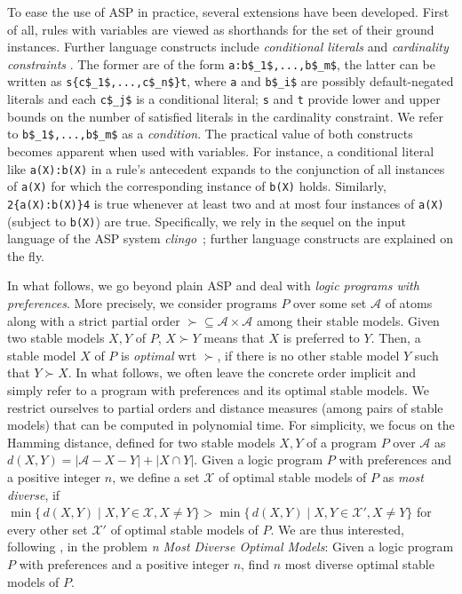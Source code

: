 \documentclass[a4paper,UKenglish]{oasics}
\newcommand{\sysfont}{\textit}
\newcommand{\clingo}{\sysfont{clingo}}
\begin{document}
To ease the use of ASP in practice, 
several extensions have been developed. 
First of all, rules with variables are viewed as shorthands for the set of their ground instances.
Further language constructs include
\emph{conditional literals} and \emph{cardinality constraints} \cite{siniso02a}.
The former are of the form
\lstinline[mathescape=true]{a:b$_1$,...,b$_m$},
the latter can be written as
\lstinline[mathescape=true]+s{c$_1$,...,c$_n$}t+,
where \lstinline{a} and \lstinline[mathescape=true]{b$_i$} are possibly default-negated literals  %
and each \lstinline[mathescape=true]{c$_j$} is a conditional literal; %
\lstinline{s} and \lstinline{t} provide lower and upper bounds on the number of satisfied literals in the cardinality constraint.
We refer to \lstinline[mathescape=true]{b$_1$,...,b$_m$} as a \emph{condition}.
%
The practical value of both constructs becomes apparent when used with variables.
For instance, a conditional literal like
\lstinline[mathescape=true]{a(X):b(X)}
in a rule's antecedent expands to the conjunction of all instances of \lstinline{a(X)} for which the corresponding instance of \lstinline{b(X)} holds.
%
Similarly,
\lstinline[mathescape=true]+2{a(X):b(X)}4+
is true whenever at least two and at most four instances of \lstinline{a(X)} (subject to \lstinline{b(X)}) are true.
%
%
%
%
Specifically, 
we rely in the sequel
on the input language of the ASP system \clingo~\cite{gekakasc14b};
further language constructs are explained on the fly.
 
In what follows, we go beyond plain ASP and deal with \emph{logic programs with preferences}.
%
More precisely,
we consider programs $P$ over some set $\mathcal{A}$ of atoms
along with a strict partial order ${\succ}\subseteq{\mathcal{A}\times\mathcal{A}} $ among their stable models. 
%
Given two stable models $X,Y$ of $P$,
$X\succ Y$ means that $X$ is preferred to $Y$.
%
Then, a stable model $X$ of $P$ is \emph{optimal} wrt $\succ$,
if there is no other stable model $Y$ such that $Y\succ X$.
%
In what follows,
we often leave the concrete order implicit and simply refer to a program with preferences and its optimal stable models.
%
%
%
%
We restrict ourselves to partial orders and distance measures (among pairs of stable models) that can be computed in polynomial time.
%
For simplicity, we focus on the Hamming distance, 
defined for two stable models $X,Y$ of a program $P$ over $\mathcal{A}$ as
\(
d(X,Y)
=
|\mathcal{A} - X - Y| + | X \cap Y |
\).
%
Given a logic program $P$ with preferences and a positive integer $n$,
we define %
a set $\mathcal{X}$ of optimal stable models of $P$ as \emph{most diverse},
if
\(
\min \{\, d(X,Y) \mid X, Y \in \mathcal{X},  X \neq Y \} 
> 
\min \{\, d(X,Y) \mid X, Y \in \mathcal{X}', X \neq Y \}
\)
for every other set $\mathcal{X}'$ of optimal stable models of $P$.
%
We are thus interested, following \cite{eiererfi13a}, in the problem \emph{n Most Diverse Optimal Models}:
%
Given a logic program $P$ with preferences and a positive integer $n$, 
find $n$ most diverse optimal stable models of $P$.
\end{document}
